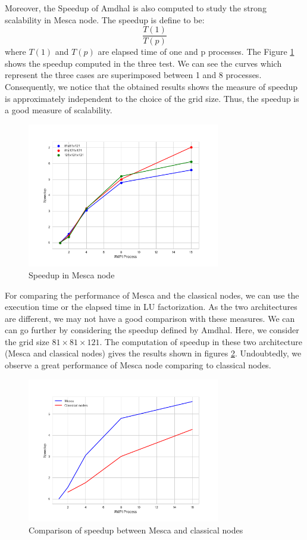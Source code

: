 Moreover, the Speedup of Amdhal is also computed to study the strong scalability in Mesca node. The speedup is define to be:
$$ \frac{T(1)}{T(p)} $$
where $T(1)$ and $T(p)$ are elapsed time of one and p processes. The Figure \ref{SpeedupMesca} shows the speedup computed in the three test. We can see the curves which represent the three cases are superimposed between 1 and 8 processes. Consequently, we notice that the obtained results shows the measure of speedup is approximately independent to the choice of the grid size. Thus, the speedup is a good measure of scalability.       
\begin{figure}[!h]
\centering 
\includegraphics[width=0.75\textwidth]{images/SpeedupMesca.png}
\caption{Speedup in Mesca node}
\label{SpeedupMesca} 
\end{figure}

For comparing the performance of Mesca and the classical nodes, we can use the execution time or the elapsed time in LU factorization. As the two architectures are different, we may not have a good comparison with these measures. We can can go further by considering the speedup defined by Amdhal. Here, we consider the grid size $ 81 \times 81 \times 121$. The computation of speedup in these two architecture (Mesca and classical nodes) gives the results shown in figures \ref{Comparison_Mesca_and_CN2}. Undoubtedly, we observe a great performance of Mesca node comparing to classical nodes.
\begin{figure}[!h]
\centering 
\includegraphics[width=0.75\textwidth]{images/Comparison_Mesca_and_CN2.png}
\caption{Comparison of speedup between Mesca and classical nodes}
\label{Comparison_Mesca_and_CN2} 
\end{figure}

